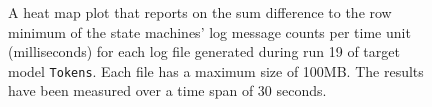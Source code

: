 \begin{figure}[htbp]
\centering
\begin{minipage}{1\textwidth}
  \centering
\end{minipage}
\caption{A heat map plot that reports on the sum difference to the row minimum of the state machines' log message counts per time unit (milliseconds) for each log file generated during run 19 of target model \texttt{Tokens}. Each file has a maximum size of 100MB. The results have been measured over a time span of 30 seconds.}
\label{figure:throughput_difference_tokens_19}
\end{figure}